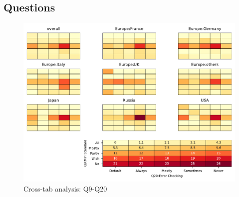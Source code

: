 
\subsection{Questions}


\begin{figure}
\begin{center}
\includegraphics[width=12cm]{../pdfs/Q9-Q20.pdf}
\caption{Cross-tab analysis: Q9-Q20}
\label{fig:Q9-Q20}
\end{center}
\end{figure}
